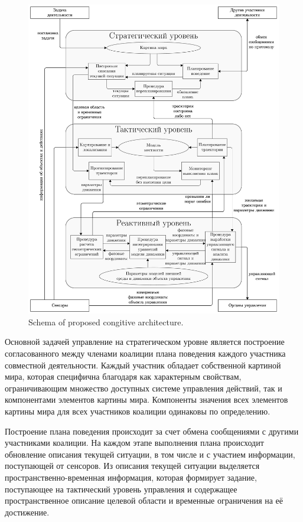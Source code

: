\documentclass{svjour3}                     %
\begin{document}
\begin{figure}
	\includegraphics[width=\textwidth]{../../images/architecture-0}
	\caption{Schema of proposed congitive architecture.}
	\label{fig:arch}
\end{figure}

Основной задачей управление на стратегическом уровне является построение согласованного между членами коалиции плана поведения каждого участника совместной деятельности. Каждый участник обладает собственной картиной мира, которая специфична благодаря как характерным свойствам, ограничивающим множество доступных системе управления действий, так и компонентами элементов картины мира. Компоненты значения всех элементов картины мира для всех участников коалиции одинаковы по определению.

Построение плана поведения происходит за счет обмена сообщениями с другими участниками коалиции. На каждом этапе выполнения плана происходит обновление описания текущей ситуации, в том числе и с участием информации, поступающей от сенсоров. Из описания текущей ситуации выделяется пространственно-временная информация, которая формирует задание, поступающее на тактический уровень управления и содержащее пространственное описание целевой области и временные ограничения на её достижение.
\end{document}
